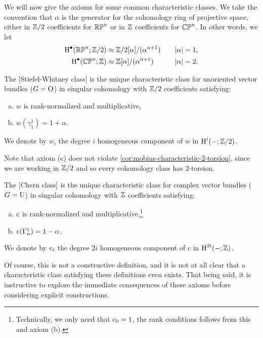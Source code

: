 We will now give the axioms for some common characteristic classes. We take the convention that $\alpha$ is the generator for the cohomology ring of projective space, either in $\mathbb{Z}/2$ coefficients for $\mathbb{RP}^n$ or in $\mathbb{Z}$ coefficients for $\mathbb{CP}^n$. In other words, we let
\[
	\begin{aligned}
		\operatorname{H}^\bullet(\mathbb{RP}^n; \mathbb{Z}/2) & \approx \mathbb{Z}/2[\alpha]/(\alpha^{n+1})\quad & |\alpha|=1, \\
		\operatorname{H}^\bullet(\mathbb{CP}^n; \mathbb{Z})   & \approx \mathbb{Z}[\alpha]/(\alpha^{n+1})\quad   & |\alpha|=2. \\
	\end{aligned}
\]

\begin{definition}
	The [Stiefel-Whitney class] is the unique characteristic class for unoriented vector bundles ($G=
		\mathrm{O}$) in singular cohomology with $\mathbb{Z}/2$ coefficients satisfying:
	\begin{enumerate}[(a)]
		\item $w$ is rank-normalized and multiplicative,
		\item $w(\gamma^1_1)=1+\alpha$.
	\end{enumerate}
	We denote by $w_i$ the degree $i$ homogeneous component of $w$ in $\operatorname{H}^i(-;\mathbb{Z}/2)$.
\end{definition}

\begin{remark}
	Note that axiom (c) does not violate \cref{cor:mobius-characteristic-2-torsion}, since we are working in $\mathbb{Z}/2$ and so every cohomology class has $2$-torsion.
\end{remark}

\begin{definition}
	The [Chern class] is the unique characteristic class for complex vector bundles ($G=\mathrm{U}$) in singular cohomology with $\mathbb{Z}$ coefficients satisfying:
	\begin{enumerate}[(a)]
		\item $\mathrm{c}$ is rank-normalized and multiplicative,\footnote{Technically, we only need that $\mathrm{c}_0=1$, the rank conditions follows from this and axiom (b).}
		\item $\mathrm{c}(\Gamma^1_n)=1-\alpha$.
	\end{enumerate}
	We denote by $\mathrm{c}_i$ the degree $2i$ homogeneous component of $c$ in $\operatorname{H}^{2i}(-;\mathbb{Z})$.
\end{definition}

Of course, this is not a constructive definition, and it is not at all clear that a characteristic class satisfying these definitions even exists. That being said, it is instructive to explore the immediate consequences of these axioms before considering explicit constructions.

